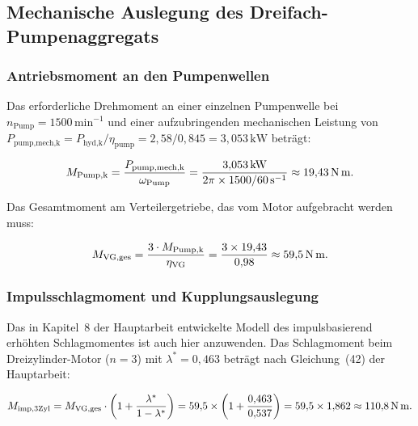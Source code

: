 ﻿\documentclass[a4paper,12pt]{article}
\begin{document}
\subsection{Mechanische Auslegung des Dreifach-Pumpenaggregats}

\subsubsection{Antriebsmoment an den Pumpenwellen}

Das erforderliche Drehmoment an einer einzelnen Pumpenwelle bei
$n_\text{Pump} = 1500\,\text{min}^{-1}$ und einer aufzubringenden
mechanischen Leistung von $P_\text{pump,mech,k} = P_\text{hyd,k}/\eta_\text{pump}
= 2{,}58/0{,}845 = 3{,}053\,\text{kW}$ beträgt:

\begin{equation}
  M_\text{Pump,k}
    = \frac{P_\text{pump,mech,k}}{\omega_\text{Pump}}
    = \frac{3{,}053\,\text{kW}}{2\pi \times 1500/60\,\text{s}^{-1}}
    \approx 19{,}43\,\text{N\,m}.
  \label{eq:M_pump}
\end{equation}

Das Gesamtmoment am Verteilergetriebe, das vom Motor aufgebracht werden muss:

\begin{equation}
  M_\text{VG,ges}
    = \frac{3 \cdot M_\text{Pump,k}}{\eta_\text{VG}}
    = \frac{3 \times 19{,}43}{0{,}98}
    \approx 59{,}5\,\text{N\,m}.
  \label{eq:M_VG}
\end{equation}

\subsubsection{Impulsschlagmoment und Kupplungsauslegung}

Das in Kapitel~8 der Hauptarbeit entwickelte Modell des impulsbasierend
erhöhten Schlagmomentes ist auch hier anzuwenden. Das Schlagmoment beim
Dreizylinder-Motor ($n=3$) mit $\lambda^* = 0{,}463$ beträgt nach
Gleichung~(42) der Hauptarbeit:

\begin{equation}
  M_\text{imp,3Zyl}
    = M_\text{VG,ges} \cdot \left(1 + \frac{\lambda^*}{1-\lambda^*}\right)
    = 59{,}5 \times \left(1 + \frac{0{,}463}{0{,}537}\right)
    = 59{,}5 \times 1{,}862
    \approx 110{,}8\,\text{N\,m}.
  \label{eq:M_imp_pump}
\end{equation}
\end{document}
